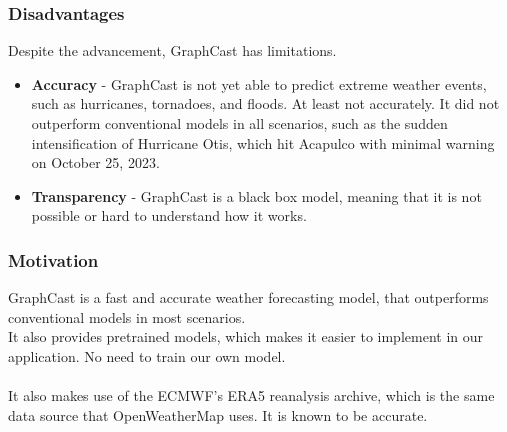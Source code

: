 \documentclass[../paper.tex]{subfiles}
\begin{document}
    \subsubsection{Disadvantages}
    Despite the advancement, GraphCast has limitations. \\
    \begin{itemize}
        \item \textbf{Accuracy} - GraphCast is not yet able to predict extreme weather events, such as hurricanes, tornadoes, and floods.
        At least not accurately.
        It did not outperform conventional models in all scenarios, such as the sudden intensification of Hurricane Otis, which hit Acapulco with minimal warning on October 25, 2023\cite{e4}.
        \item \textbf{Transparency} - GraphCast is a black box model, meaning that it is not possible or hard to understand how it works.
    \end{itemize}

    \subsubsection{Motivation}
    GraphCast is a fast and accurate weather forecasting model, that outperforms conventional models in most scenarios.\\
    It also provides pretrained models, which makes it easier to implement in our application.
    No need to train our own model.
    \\\\
    It also makes use of the ECMWF's ERA5 reanalysis archive, which is the same data source that OpenWeatherMap uses.
    It is known to be accurate.
\end{document}
